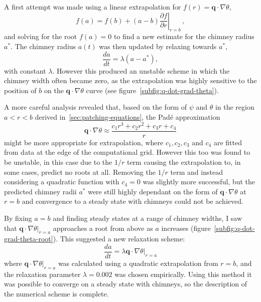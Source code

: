 \documentclass[11pt,twocolumn]{article}
\begin{document}
A first attempt was made using a linear extrapolation for $f(r) = \mathbf{q} \cdot \nabla \theta$,
\begin{equation}
f(a) = f(b) + (a-b) \left. \frac{\partial f}{\partial r}\right|_{r=b} \, ,
\end{equation}
and solving for the root $f(a)=0$ to find a new estimate for the chimney radius $a^*$. The chimney radius $a(t)$ was then updated by relaxing towards $a^*$,
\begin{equation}
\frac{da}{dt} = \lambda (a - a^*),
\end{equation}
with constant $\lambda$. However this produced an unstable scheme in which the chimney width often became zero, as the extrapolation was highly sensitive to the position of $b$ on the $\mathbf{q} \cdot \nabla \theta$ curve (see figure~\ref{subfig:q-dot-grad-theta}).

A more careful analysis revealed that, based on the form of $\psi$ and $\theta$ in the region $a < r < b$ derived in~\autoref{sec:patching-equations}, the Pad\'{e} approximation
\begin{equation}
\mathbf{q} \cdot \nabla \theta \approx \frac{c_1 r^3 + c_2 r^2 + c_3 r + c_4}{r}
\end{equation}
might be more appropriate for extrapolation, where $c_1, c_2, c_3$ and $c_4$ are fitted from data at the edge of the computational grid. However this too was found to be unstable, in this case due to the $1/r$ term causing the extrapolation to, in some cases, predict no roots at all. Removing the $1/r$ term and instead considering a quadratic function with $c_4=0$ was slightly more successful, but the predicted chimney radii $a^*$ were still highly dependant on the form of $\mathbf{q} \cdot \nabla \theta$ at $r=b$ and convergence to a steady state with chimneys could not be achieved.

By fixing $a=b$ and finding steady states at a range of chimney widths, I saw that $\left. \mathbf{q} \cdot \nabla \theta \right|_{r=a}$ approaches a root from above as $a$ increases (figure~\ref{subfig:q-dot-grad-theta-root}). This suggested a new relaxation scheme:
\begin{equation}
\label{eq:relaxation-q-dot-grad-theta}
\frac{da}{dt} = \lambda \left. \mathbf{q} \cdot \nabla \theta \right|_{r=a}
\end{equation}
where $\left. \mathbf{q} \cdot \nabla \theta \right|_{r=a}$ was calculated using a quadratic extrapolation from $r=b$, and the relaxation parameter $\lambda = 0.002$ was chosen empirically. Using this method it was possible to converge on a steady state with chimneys, so the description of the numerical scheme is complete.
\end{document}
